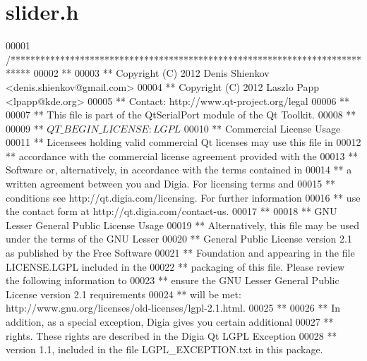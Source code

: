 \hypertarget{a00025_source}{\section{slider.\+h}
\label{a00025_source}
}

\begin{DoxyCode}
00001 \textcolor{comment}{/****************************************************************************}
00002 \textcolor{comment}{**}
00003 \textcolor{comment}{** Copyright (C) 2012 Denis Shienkov <denis.shienkov@gmail.com>}
00004 \textcolor{comment}{** Copyright (C) 2012 Laszlo Papp <lpapp@kde.org>}
00005 \textcolor{comment}{** Contact: http://www.qt-project.org/legal}
00006 \textcolor{comment}{**}
00007 \textcolor{comment}{** This file is part of the QtSerialPort module of the Qt Toolkit.}
00008 \textcolor{comment}{**}
00009 \textcolor{comment}{** $QT\_BEGIN\_LICENSE:LGPL$}
00010 \textcolor{comment}{** Commercial License Usage}
00011 \textcolor{comment}{** Licensees holding valid commercial Qt licenses may use this file in}
00012 \textcolor{comment}{** accordance with the commercial license agreement provided with the}
00013 \textcolor{comment}{** Software or, alternatively, in accordance with the terms contained in}
00014 \textcolor{comment}{** a written agreement between you and Digia.  For licensing terms and}
00015 \textcolor{comment}{** conditions see http://qt.digia.com/licensing.  For further information}
00016 \textcolor{comment}{** use the contact form at http://qt.digia.com/contact-us.}
00017 \textcolor{comment}{**}
00018 \textcolor{comment}{** GNU Lesser General Public License Usage}
00019 \textcolor{comment}{** Alternatively, this file may be used under the terms of the GNU Lesser}
00020 \textcolor{comment}{** General Public License version 2.1 as published by the Free Software}
00021 \textcolor{comment}{** Foundation and appearing in the file LICENSE.LGPL included in the}
00022 \textcolor{comment}{** packaging of this file.  Please review the following information to}
00023 \textcolor{comment}{** ensure the GNU Lesser General Public License version 2.1 requirements}
00024 \textcolor{comment}{** will be met: http://www.gnu.org/licenses/old-licenses/lgpl-2.1.html.}
00025 \textcolor{comment}{**}
00026 \textcolor{comment}{** In addition, as a special exception, Digia gives you certain additional}
00027 \textcolor{comment}{** rights.  These rights are described in the Digia Qt LGPL Exception}
00028 \textcolor{comment}{** version 1.1, included in the file LGPL\_EXCEPTION.txt in this package.}

\end{DoxyCode}
